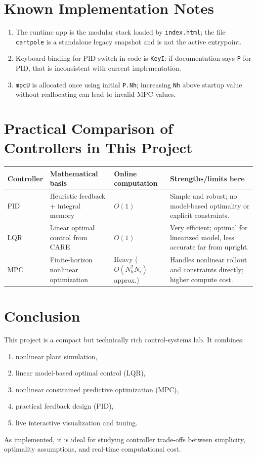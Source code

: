 \documentclass[11pt,a4paper]{article}
\begin{document}
\section{Known Implementation Notes}
\begin{enumerate}[label=\arabic*.]
  \item The runtime app is the modular stack loaded by \texttt{index.html}; the file \texttt{cartpole} is a standalone legacy snapshot and is not the active entrypoint.
  \item Keyboard binding for PID switch in code is \texttt{KeyI}; if documentation says \texttt{P} for PID, that is inconsistent with current implementation.
  \item \texttt{mpcU} is allocated once using initial \texttt{P.Nh}; increasing \texttt{Nh} above startup value without reallocating can lead to invalid MPC values.
\end{enumerate}

\clearpage
\section{Practical Comparison of Controllers in This Project}
\begin{center}
\begin{tabular}{>{\raggedright\arraybackslash}p{2.5cm} p{4.2cm} p{4.1cm} p{3.8cm}}
\toprule
Controller & Mathematical basis & Online computation & Strengths/limits here \\
\midrule
PID & Heuristic feedback + integral memory & $O(1)$ & Simple and robust; no model-based optimality or explicit constraints. \\
LQR & Linear optimal control from CARE & $O(1)$ & Very efficient; optimal for linearized model, less accurate far from upright. \\
MPC & Finite-horizon nonlinear optimization & Heavy ($O(N_h^2N_i)$ approx.) & Handles nonlinear rollout and constraints directly; higher compute cost. \\
\bottomrule
\end{tabular}
\end{center}

\section*{Conclusion}
This project is a compact but technically rich control-systems lab. It combines:
\begin{enumerate}[label=\arabic*.]
  \item nonlinear plant simulation,
  \item linear model-based optimal control (LQR),
  \item nonlinear constrained predictive optimization (MPC),
  \item practical feedback design (PID),
  \item live interactive visualization and tuning.
\end{enumerate}
As implemented, it is ideal for studying controller trade-offs between simplicity, optimality assumptions, and real-time computational cost.
\end{document}
